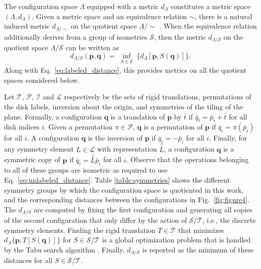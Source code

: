 \documentclass[default,iicol]{sn-jnl}%
\theoremstyle{thmstyleone}%
\theoremstyle{thmstyletwo}%
\theoremstyle{thmstylethree}%
\renewcommand{\vec}[1]{\bar{#1}}
\providecommand{\mat}[1]{\bar{\bar{#1}}}
\providecommand{\config}[1]{\mathbf{#1}}
\begin{document}
The configuration space $\Lambda$ equipped with a metric $d_\Lambda$ constitutes a metric space $(\Lambda,d_\Lambda)$. Given a metric space and an equivalence relation $\sim$, there is a natural induced metric $d_{\Lambda / \sim}$ on the quotient space ${\Lambda/\!\!\sim}$ \cite{burago2001course}. When the equivalence relation additionally derives from a group of isometries $\mathcal{S}$, then the metric $d_{\Lambda / \mathcal{S}}$ on the quotient space $\Lambda / \mathcal{S}$ can be written as
\begin{equation}
d_{\Lambda / \mathcal{S}}(\config{p}, \config{q}) = \inf\limits_{\substack{S \in \mathcal{S}}} \{ d_\Lambda[\config{p}, S(\config{q})] \}.
\label{eq:unlabeled_distance}
\end{equation}
Along with Eq.\ \ref{eq:labeled_distance}, this provides metrics on all the quotient spaces considered below.

Let $\mathcal{T}$, $\mathcal{P}$, $\mathcal{I}$ and $\mathcal{L}$ respectively be the sets of rigid translations, permutations of the disk labels, inversion about the origin, and symmetries of the tiling of the plane. Formally, a configuration $\config{q}$ is a translation of $\config{p}$ by $\vec{t}$ if $\vec{q}_i = \vec{p}_i + \vec{t}$ for all disk indices $i$. Given a permutation $\pi \in \mathcal{P}$, $\config{q}$ is a permutation of $\config{p}$ if $\vec{q}_i = \pi(\vec{p}_i)$ for all $i$. A configuration $\config{q}$ is the inversion of $\config{p}$ if $\vec{q}_i = -\vec{p}_i$ for all $i$. Finally, for any symmetry element $L \in \mathcal{L}$ with representation $\mat{L}$, a configuration $\config{q}$ is a symmetric copy of $\config{p}$ if $\vec{q}_i = \mat{L} \vec{p}_i$ for all $i$. Observe that the operations belonging to all of these groups are isometric as required to use Eq.\ \ref{eq:unlabeled_distance}. Table \ref{table:symmetries} shows the different symmetry groups by which the configuration space is quotiented in this work, and the corresponding distances between the configurations in Fig.\ \ref{fig:figure4}. The $d_{\Lambda / S}$ are computed by fixing the first configuration and generating all copies of the second configuration that only differ by the action of $\mathcal{S / T}$, i.e., the discrete symmetry elements. Finding the rigid translation $T \in \mathcal{T}$ that minimizes $d_\Lambda\{\config{p}, T[S(\config{q})]\}$ for $S \in \mathcal{S / T}$ is a global optimization problem that is handled by the Tabu search algorithm \cite{chelouah2000tabu,glover1989tabu}. Finally, $d_{\Lambda / \mathcal{S}}$ is reported as the minimum of these distances for all $S \in \mathcal{S / T}$.
\end{document}
